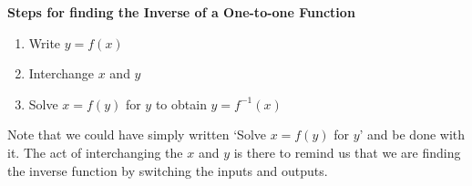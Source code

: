 \smallskip

\colorbox{ResultColor}{\bbm

 \label{inverseprocedure}

\centerline{\textbf{Steps for finding the Inverse of a One-to-one Function}}  

\begin{enumerate}

\item  Write $y=f(x)$

\item Interchange $x$ and $y$

\item  Solve $x = f(y)$ for $y$ to obtain $y=f^{-1}(x)$

\end{enumerate}

\ebm}

\smallskip 

Note that we could have simply written `Solve $x=f(y)$ for $y$' and be done with it.  The act of interchanging the $x$ and $y$ is there to remind us that we are finding the inverse function by switching the inputs and outputs.  

